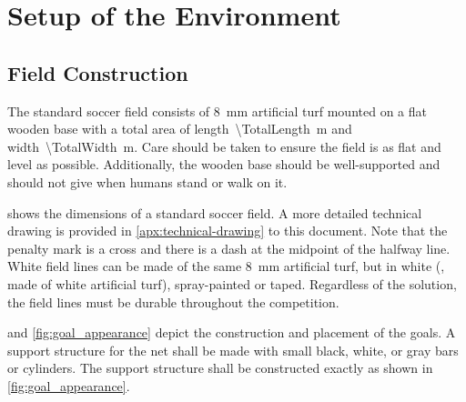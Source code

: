 \section{Setup of the Environment}
\label{sec:setup_environment}

\subsection{Field Construction}
\label{sec:field_dim}

The standard soccer field consists of \qty{8}{\milli\metre} artificial turf mounted on a flat wooden base with a total area of length~\qty{\TotalLength}{\metre} and width~\qty{\TotalWidth}{\metre}. Care should be taken to ensure the field is as flat and level as possible. Additionally, the wooden base should be well-supported and should not give when humans stand or walk on it.

 shows the dimensions of a standard soccer field.
A more detailed technical drawing is provided in \cref{apx:technical-drawing} to this document.
Note that the penalty mark is a cross and there is a dash at the midpoint of the halfway line. White field lines can be made of the same \qty{8}{\milli\metre} artificial turf, but in white (\ie, made of white artificial turf), spray-painted or taped. Regardless of the solution, the field lines must be durable throughout the competition.

 and \cref{fig:goal_appearance} depict the construction and placement of the goals. A support structure for the net shall be made with small black, white, or gray bars or cylinders.  The support structure shall be constructed exactly as shown in \cref{fig:goal_appearance}.

